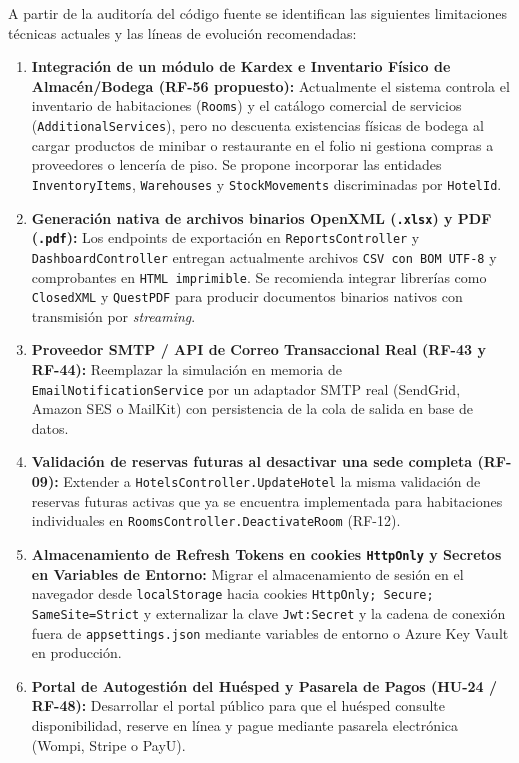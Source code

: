 \documentclass[12pt,a4paper]{article}
\begin{document}
A partir de la auditor\'ia del c\'odigo fuente se identifican las siguientes limitaciones t\'ecnicas actuales y las l\'ineas de evoluci\'on recomendadas:

\begin{enumerate}
    \item \textbf{Integraci\'on de un m\'odulo de Kardex e Inventario F\'isico de Almac\'en/Bodega (RF-56 propuesto):} Actualmente el sistema controla el inventario de habitaciones (\texttt{Rooms}) y el cat\'alogo comercial de servicios (\texttt{AdditionalServices}), pero no descuenta existencias f\'isicas de bodega al cargar productos de minibar o restaurante en el folio ni gestiona compras a proveedores o lencer\'ia de piso. Se propone incorporar las entidades \texttt{InventoryItems}, \texttt{Warehouses} y \texttt{StockMovements} discriminadas por \texttt{HotelId}.
    \item \textbf{Generaci\'on nativa de archivos binarios OpenXML (\texttt{.xlsx}) y PDF (\texttt{.pdf}):} Los endpoints de exportaci\'on en \texttt{ReportsController} y \texttt{DashboardController} entregan actualmente archivos \texttt{CSV con BOM UTF-8} y comprobantes en \texttt{HTML imprimible}. Se recomienda integrar librer\'ias como \texttt{ClosedXML} y \texttt{QuestPDF} para producir documentos binarios nativos con transmisi\'on por \textit{streaming}.
    \item \textbf{Proveedor SMTP / API de Correo Transaccional Real (RF-43 y RF-44):} Reemplazar la simulaci\'on en memoria de \texttt{EmailNotificationService} por un adaptador SMTP real (SendGrid, Amazon SES o MailKit) con persistencia de la cola de salida en base de datos.
    \item \textbf{Validaci\'on de reservas futuras al desactivar una sede completa (RF-09):} Extender a \texttt{HotelsController.UpdateHotel} la misma validaci\'on de reservas futuras activas que ya se encuentra implementada para habitaciones individuales en \texttt{RoomsController.DeactivateRoom} (RF-12).
    \item \textbf{Almacenamiento de Refresh Tokens en cookies \texttt{HttpOnly} y Secretos en Variables de Entorno:} Migrar el almacenamiento de sesi\'on en el navegador desde \texttt{localStorage} hacia cookies \texttt{HttpOnly; Secure; SameSite=Strict} y externalizar la clave \texttt{Jwt:Secret} y la cadena de conexi\'on fuera de \texttt{appsettings.json} mediante variables de entorno o Azure Key Vault en producci\'on.
    \item \textbf{Portal de Autogesti\'on del Hu\'esped y Pasarela de Pagos (HU-24 / RF-48):} Desarrollar el portal p\'ublico para que el hu\'esped consulte disponibilidad, reserve en l\'inea y pague mediante pasarela electr\'onica (Wompi, Stripe o PayU).
\end{enumerate}
\end{document}
